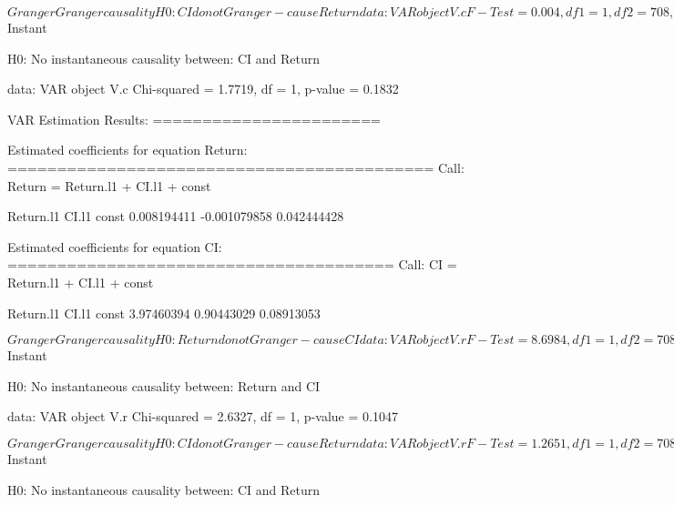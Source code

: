 \documentclass{article}
\begin{document}
\begin{Schunk}
\begin{Soutput}
$Granger

	Granger causality H0: CI do not Granger-cause Return

data:  VAR object V.c
F-Test = 0.004, df1 = 1, df2 = 708, p-value = 0.9498


$Instant

	H0: No instantaneous causality between: CI and Return

data:  VAR object V.c
Chi-squared = 1.7719, df = 1, p-value = 0.1832
\end{Soutput}
\begin{Soutput}
VAR Estimation Results:
======================= 

Estimated coefficients for equation Return: 
=========================================== 
Call:
Return = Return.l1 + CI.l1 + const 

   Return.l1        CI.l1        const 
 0.008194411 -0.001079858  0.042444428 


Estimated coefficients for equation CI: 
======================================= 
Call:
CI = Return.l1 + CI.l1 + const 

 Return.l1      CI.l1      const 
3.97460394 0.90443029 0.08913053 
\end{Soutput}
\begin{Soutput}
$Granger

	Granger causality H0: Return do not Granger-cause CI

data:  VAR object V.r
F-Test = 8.6984, df1 = 1, df2 = 708, p-value = 0.00329


$Instant

	H0: No instantaneous causality between: Return and CI

data:  VAR object V.r
Chi-squared = 2.6327, df = 1, p-value = 0.1047
\end{Soutput}
\begin{Soutput}
$Granger

	Granger causality H0: CI do not Granger-cause Return

data:  VAR object V.r
F-Test = 1.2651, df1 = 1, df2 = 708, p-value = 0.2611


$Instant

	H0: No instantaneous causality between: CI and Return


\end{Soutput}
\end{Schunk}
\end{document}
